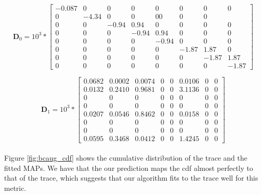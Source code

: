 \documentclass[a4paper,11pt,titlepage]{article}
\begin{document}
\begin{equation}
    \mathbf{D}_0 = 10^3*\begin{bmatrix}
-0.087    &    0    &     0     &    0     &    0    &     0    &     0     &    0 \\
0 &  -4.34    &     0     &    0     &    0         0     &    0    &     0 \\
 0    &     0 &  -0.94  &  0.94  &      0    &     0    &     0    &     0 \\
  0     &    0     &    0   &  -0.94  &  0.94  &       0    &     0    &     0 \\
   0    &     0    &     0    &     0  &  -0.94   &      0     &    0    &     0 \\
 0    &     0    &     0   &      0     &    0  & -1.87  &  1.87   &      0 \\
  0     &    0    &     0     &    0     &    0   &      0  & -1.87  &  1.87 \\
0     &    0     &    0    &     0    &     0    &     0    &     0 &  -1.87
    \end{bmatrix}
\end{equation}

\begin{equation}
    \mathbf{D}_1 = 10^3*\begin{bmatrix}
0.0682  &  0.0002  &  0.0074    &   0   &  0   & 0.0106   &  0   &   0 \\
0.0132  &  0.2410  &  0.9681   &    0    &     0  &   3.1136     &    0    &     0 \\
0    &     0    &     0     &    0    &     0   &      0    &     0   &      0 \\
0    &     0     &    0     &    0    &     0   &      0    &     0     &    0 \\
0.0207  &  0.0546  &  0.8462    &     0   &      0 &   0.0158     &    0    &     0 \\
0    &     0     &    0     &    0    &     0   &      0    &     0     &    0 \\
0    &     0     &    0     &    0    &     0   &      0    &     0     &    0 \\
0.0595  &  0.3468  &  0.0412    &     0   &      0  &  1.4245    &     0    &     0 
    \end{bmatrix}
\end{equation} \\

Figure \ref{fig:bcaug_cdf} shows the cumulative distribution of the trace and the fitted MAPs. We have that the our prediction maps the cdf almost perfectly to that of the trace, which suggests that our algorithm fits to the trace well for this metric. 
\end{document}
